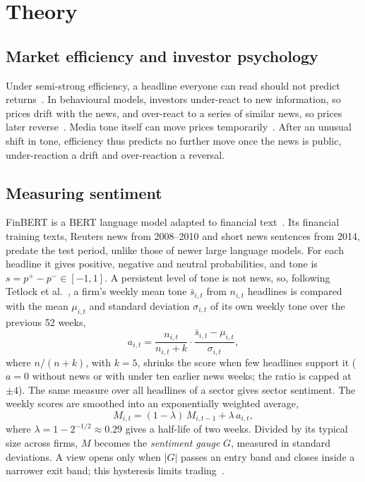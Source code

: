 \section{Theory}\label{sec:theory}
\subsection{Market efficiency and investor psychology}
Under semi-strong efficiency, a headline everyone can read should not predict returns~\cite{fama}. In behavioural models, investors under-react to new information, so prices drift with the news, and over-react to a series of similar news, so prices later reverse~\cite{bsv}. Media tone itself can move prices temporarily~\cite{tetlock2007,hillert}. After an unusual shift in tone, efficiency thus predicts no further move once the news is public, under-reaction a drift and over-reaction a reversal.

\subsection{Measuring sentiment}
FinBERT is a BERT language model adapted to financial text~\cite{araci}. Its financial training texts, Reuters news from 2008--2010 and short news sentences from 2014, predate the test period, unlike those of newer large language models. For each headline it gives positive, negative and neutral probabilities, and tone is $s = p^{+} - p^{-} \in [-1, 1]$. A persistent level of tone is not news, so, following Tetlock et al.~\cite{tetlock2008}, a firm's weekly mean tone $\bar s_{i,t}$ from $n_{i,t}$ headlines is compared with the mean $\mu_{i,t}$ and standard deviation $\sigma_{i,t}$ of its own weekly tone over the previous 52 weeks,
\begin{equation}\label{eq:abnormal}
a_{i,t} = \frac{n_{i,t}}{n_{i,t} + k} \cdot \frac{\bar s_{i,t} - \mu_{i,t}}{\sigma_{i,t}} ,
\end{equation}
where $n/(n + k)$, with $k = 5$, shrinks the score when few headlines support it ($a = 0$ without news or with under ten earlier news weeks; the ratio is capped at $\pm 4$). The same measure over all headlines of a sector gives sector sentiment. The weekly scores are smoothed into an exponentially weighted average,
\begin{equation}\label{eq:smoothing}
M_{i,t} = (1 - \lambda)\, M_{i,t-1} + \lambda\, a_{i,t} ,
\end{equation}
where $\lambda = 1 - 2^{-1/2} \approx 0.29$ gives a half-life of two weeks. Divided by its typical size across firms, $M$ becomes the \emph{sentiment gauge} $G$, measured in standard deviations. A view opens only when $|G|$ passes an entry band and closes inside a narrower exit band; this hysteresis limits trading~\cite{grinoldkahn}.

